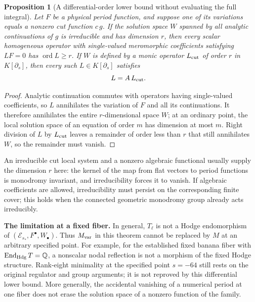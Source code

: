 \documentclass[11pt,a4paper,oneside]{article}
\theoremstyle{plain}
\newtheorem{proposition}[theorem]{Proposition}
\theoremstyle{definition}
\theoremstyle{remark}
\newcommand{\Q}{\mathbb Q}
\numberwithin{equation}{section}
\begin{document}
\begin{proposition}[A differential-order lower bound without evaluating the full integral]\label{unified:prop:order}
Let $F$ be a physical period function, and suppose one of its variations equals a nonzero cut function $c\,g$.
If the solution space $W$ spanned by all analytic continuations of $g$ is irreducible and has dimension $r$,
then every scalar homogeneous operator with single-valued meromorphic coefficients satisfying $LF=0$ has
$\operatorname{ord}L\ge r$.
If $W$ is defined by a monic operator $L_{\rm cut}$ of order $r$ in $K[\partial_s]$,
then every such $L\in K[\partial_s]$ satisfies
\[
 L=A\,L_{\rm cut}.
\]
\end{proposition}
\begin{proof}
Analytic continuation commutes with operators having single-valued coefficients, so $L$ annihilates the variation of $F$ and all its continuations.
It therefore annihilates the entire $r$-dimensional space $W$; at an ordinary point, the local solution space of an equation of order $m$ has dimension at most $m$.
Right division of $L$ by $L_{\rm cut}$ leaves a remainder of order less than $r$ that still annihilates $W$, so the remainder must vanish.
\end{proof}
An irreducible cut local system and a nonzero algebraic functional usually supply the dimension $r$ here:
the kernel of the map from flat vectors to period functions is monodromy invariant, and irreducibility forces it to vanish.
If algebraic coefficients are allowed, irreducibility must persist on the corresponding finite cover;
this holds when the connected geometric monodromy group already acts irreducibly.

\textbf{The limitation at a fixed fiber.}
In general, $T_\ell$ is not a Hodge endomorphism of $(\mathcal E_{s_*},F^\bullet,W_\bullet)$.
Thus $M_{\rm var}$ in this theorem cannot be replaced by $M$ at an arbitrary specified point.
For example, for the established fixed banana fiber with $\operatorname{End}_{\rm Hdg}T=\Q$,
a nonscalar nodal reflection is not a morphism of the fixed Hodge structure.
Rank-eight minimality at the specified point $s=-64$ still rests on the original regulator and group arguments;
it is not reproved by this differential lower bound.
More generally, the accidental vanishing of a numerical period at one fiber does not erase the solution space of a nonzero function of the family.
\end{document}
